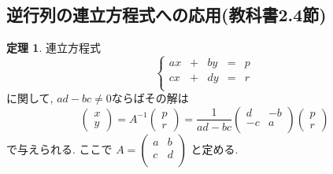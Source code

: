 \documentclass[dvipdfmx,a4paper,11pt]{article}
\theoremstyle{definition}
\newtheorem{thm}{定理}
\begin{document}
\subsection{逆行列の連立方程式への応用(教科書2.4節)}



\begin{tcolorbox}[
    colback = white,
    colframe = green!35!black,
    fonttitle = \bfseries,
    breakable = true]
    \begin{thm}
連立方程式
$$
 \left\{ 
\begin{matrix}
ax&+&by&= &p \\
cx&+&dy&= &r \\
\end{matrix}
\right.
$$
に関して, $ad-bc \neq 0$ならばその解は
$$
 \begin{pmatrix}
 x \\
 y
 \end{pmatrix} 
 = A^{-1}
  \begin{pmatrix}
 p \\
 r
 \end{pmatrix} 
 =
  \frac{1}{ad-bc}
 \begin{pmatrix}
 d& -b  \\
 -c& a  \\
 \end{pmatrix} 
   \begin{pmatrix}
 p \\
 r
 \end{pmatrix} 
$$
で与えられる. 
ここで
 $A=
  \begin{pmatrix}
 a& b  \\
 c& d  \\
 \end{pmatrix} 
 $
 と定める.
    \end{thm}
 \end{tcolorbox}
 
\end{document}
